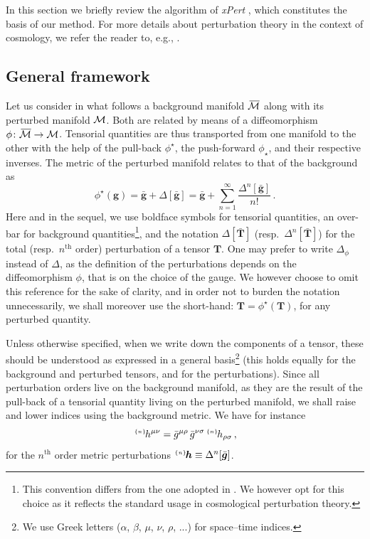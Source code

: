 \documentclass[notitlepage,onecolumn,floatfix,preprintnumbers,aps,prd,showpacs,nofootinbib,amsmath,amssymb,amsfonts]{revtex4-1}
\newcommand{\be}{\begin{equation}}
\newcommand{\ee}{\end{equation}}
\newcommand{\gr}[1]{{\bm #1}}
\newcommand{\<}{\langle}
\renewcommand{\>}{\rangle}
\newcommand{\xPert}{{\em \lowercase{x}P\lowercase{ert}}}
\newcommand{\pert}[2]{{}^{\mbox{\,\tiny $\{#1\}\!$}}{#2}}
\begin{document}
In this section we briefly review the algorithm of {\xPert} \cite{Brizuela:2008ra}, which constitutes the basis of our method. 
For more details about perturbation theory in the context of cosmology, we refer the reader to, e.g., \cite{Bruni1997,Nakamura2007}. 

\subsection{General framework}\label{secGeneral}

Let us consider in what follows a background manifold $\, \overline{\! \cal M}$ along with its perturbed manifold $\cal M$. 
Both are related by means of a diffeomorphism $\phi \colon \, \overline{\! \cal M} \to {\cal M}$. 
Tensorial quantities are thus transported from one manifold to the other with the help of the pull-back $\phi^\star$, 
the push-forward $\phi_\star$, and their respective inverses. 
The metric of the perturbed manifold relates to that of the background as 
\be
	\phi^\star(\gr{g}) 
		= \bar{\bm g} + \Delta[\bar{\bm g}] 
		= \bar{\bm g} + \sum_{n=1}^{\infty} \frac{\Delta^{n}[\bar{\bm g}]}{n!} \, . 
	\label{eq:expansion_g}
\ee
Here and in the sequel, we use boldface symbols for tensorial quantities, an over-bar for background quantities\footnote{
%
This convention differs from the one adopted in \cite{Brizuela:2008ra}. 
We however opt for this choice as it reflects the standard usage in cosmological perturbation theory.
%
}, and the notation $\Delta[\bar{\bm T}]$ (resp.\ $\Delta^{n}[\bar{\bm T}]$) for the total (resp.\ $n^{\mathrm{th}}$ order) 
perturbation of a tensor $\gr{T}$. One may prefer to write $\Delta_\phi$ instead of $\Delta$, as the definition of the perturbations 
depends on the diffeomorphism $\phi$, that is on the choice of the gauge. We however choose to omit this reference for the sake 
of clarity, and in order not to burden the notation unnecessarily, we shall moreover use the short-hand: 
$\bm T = \phi^\star(\bm T)$, for any perturbed quantity. 

Unless otherwise specified, when we write down the components of a tensor, these should be understood as expressed 
in a general basis\footnote{
%
We use Greek letters ($\alpha$, $\beta$, $\mu$, $\nu$, $\rho$, ...)
for space--time indices.
%
} (this holds equally for the background and perturbed tensors, and for the perturbations). 
Since all perturbation orders live on the background manifold, as they are the result of the pull-back of a tensorial quantity 
living on the perturbed manifold, we shall raise and lower indices using the background metric. We have for instance 
\be
	\pert{n}{h^{\mu \nu}} 
		= \bar g^{\mu \rho} \, \bar g^{\nu \sigma} \pert{n}{h_{\rho \sigma}} \, , 
	\label{eq:updown_pertmet}
\ee
for the $n^{\mathrm{th}}$ order metric perturbations $\! \pert{n}{\bm h} \equiv \Delta^{n}[\bar{\bm g}]$. 
\end{document}
